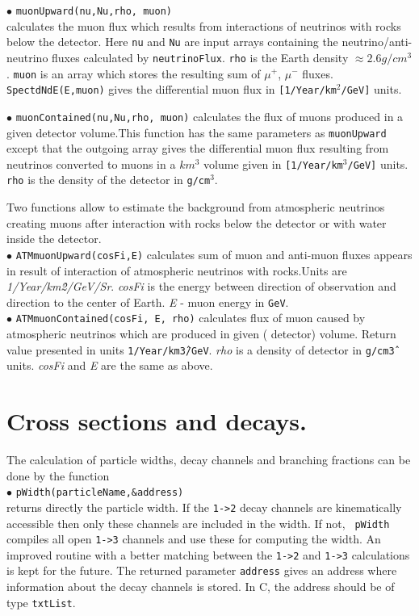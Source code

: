 \documentclass[12pt,a4paper]{article}
\begin{document}
\noindent
$\bullet$ \verb|muonUpward(nu,Nu,rho, muon)|\\
calculates the muon flux which results from interactions of
neutrinos with rocks below the detector. Here  {\tt nu} and {\tt Nu} are input arrays containing the
neutrino/anti-neutrino fluxes calculated by {\tt neutrinoFlux}. 
{\tt rho} is  the Earth density $\approx 2.6g/cm^3$. {\tt muon} is an
array which stores the resulting sum of $\mu^+$, $\mu^-$ fluxes. {\tt SpectdNdE(E,muon)}  gives the
differential muon flux  in \verb|[1/Year/km|$^2$\verb|/GeV]| units.  
 

\noindent $\bullet$ \verb|muonContained(nu,Nu,rho, muon)|
calculates  the flux  of muons  produced in a given detector volume.This function  has the same parameters as \verb|muonUpward| 
except that the  outgoing  array gives the differential muon flux resulting from neutrinos converted to muons 
in a  $km^3$ volume given  in \verb|[1/Year/km|$^3$\verb|/GeV]| units.  \verb|rho| is the density of the detector in 
\verb|g/cm|$^3$.


Two functions allow to estimate the background from atmospheric neutrinos creating muons after interaction  with rocks below the detector  or with water inside the detector.\\
\noindent $\bullet$  \verb|ATMmuonUpward(cosFi,E)| calculates sum of  muon
and anti-muon fluxes appears in result of
interaction of  atmospheric  neutrinos with rocks.Units are  {\it
1/Year/km\^2/GeV/Sr}. { \it cosFi}  is the energy between direction of
observation and direction to the center of Earth. {\it E} - muon energy in
{\tt GeV}.\\
\noindent $\bullet$  \verb|ATMmuonContained(cosFi, E, rho)| calculates  flux
of muon caused by atmospheric  neutrinos  which are produced in given ( detector)
volume. Return value presented in units {\tt  1/Year/km\^3/GeV}. {\it rho} is
a density of detector in  {\tt g/cm\^3} units. {\it cosFi} and {\it E} are the
same as above. 



\section{Cross sections and decays.}
\label{cross_section}

The calculation of particle widths, decay channels  and branching fractions
can be done by the function\\

\noindent
$\bullet$ \verb|pWidth(particleName,&address)|\\
returns directly the particle width. If the  \verb|1->2| 
decay channels are kinematically accessible then only these channels are
included in the width.  If not, {\tt
pWidth} compiles all open \verb|1->3| channels and use these for  computing the width.
An improved routine with a  better matching  between
the \verb|1->2| and \verb|1->3| calculations is kept for the future. 
The returned  parameter \verb|address| 
gives  an address where information about the decay channels is stored.
In C, the address should be of type {\tt  txtList}.
\end{document}
